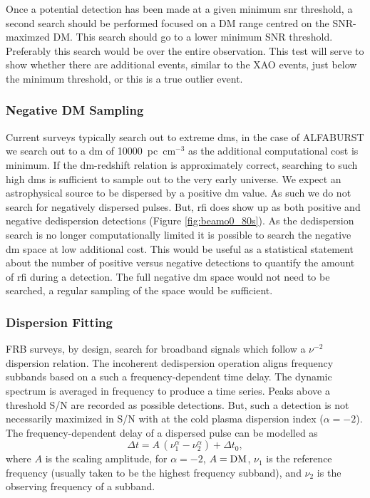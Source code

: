 \documentclass[a4paper,fleqn,usenatbib]{mnras}
\begin{document}
Once a potential detection has been made at a given minimum \gls{snr} threshold,
a second search should be performed focused on a DM range centred on the
SNR-maximzed DM. This search should go to a lower minimum SNR threshold.
Preferably this search would be over the entire observation. This test will
serve to show whether there are additional events, similar to the XAO events,
just below the minimum threshold, or this is a true outlier event.

\subsubsection{Negative DM Sampling}

Current surveys typically search out to extreme \glspl{dm}, in the case of
ALFABURST we search out to a \gls{dm} of 10000~pc~cm$^{-3}$ as the additional
computational cost is minimum. If the \gls{dm}-redshift relation is
approximately correct, searching to such high \glspl{dm} is sufficient to sample
out to the very early universe. We expect an astrophysical source to be
dispersed by a positive \gls{dm} value. As such we do not search for negatively
dispersed pulses. But, \gls{rfi} does show up as both positive and negative
dedispersion detections (Figure \ref{fig:beamo0_80s}). As the dedispersion
search is no longer computationally limited it is possible to search the
negative \gls{dm} space at low additional cost. This would be useful as a
statistical statement about the number of positive versus negative detections to
quantify the amount of \gls{rfi} during a detection. The full negative \gls{dm}
space would not need to be searched, a regular sampling of the space would be
sufficient.

\subsubsection{Dispersion Fitting}

FRB surveys, by design, search for broadband signals which follow a $\nu^{-2}$
dispersion relation. The incoherent dedispersion operation aligns frequency
subbands based on a such a frequency-dependent time delay. The dynamic spectrum
is averaged in frequency to produce a time series. Peaks above a threshold S/N
are recorded as possible detections. But, such a detection is not necessarily
maximized in S/N with at the cold plasma dispersion index ($\alpha = -2$). The
frequency-dependent delay of a dispersed pulse can be modelled as
%
\begin{equation}
\Delta t = A \, (\nu_1^{\alpha} - \nu_2^{\alpha}) + \Delta t_0,
\end{equation}
%
where $A$ is the scaling amplitude, for $\alpha = -2$, $A = {\rm DM}$, $\nu_1$
is the reference frequency (usually taken to be the highest frequency subband),
and $\nu_2$ is the observing frequency of a subband.
\end{document}
